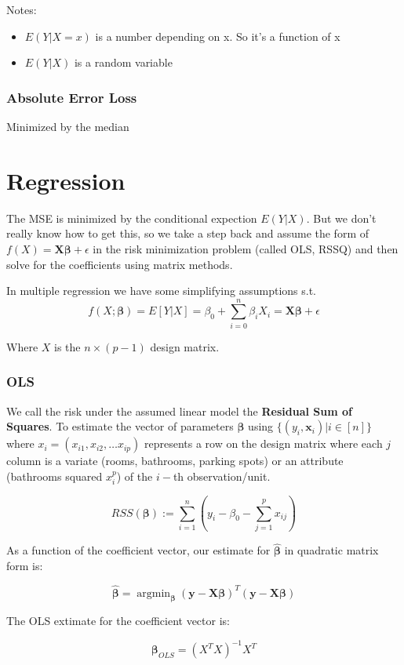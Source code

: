 \documentclass{article}
\DeclareMathOperator*{\argmin}{argmin} %
\begin{document}
Notes:
\begin{itemize}
\item $E(Y|X=x)$ is a number depending on x. So it's a function of x
\item $E(Y|X)$ is a random variable
\end{itemize}

\subsubsection{Absolute Error Loss}
Minimized by the median



\section{Regression}
The MSE is minimized by the conditional expection $E(Y|X)$. But we don't really know how to get this, so we take a step back and assume the form of $f(X)= \bm X \bm \beta + \epsilon$ in the risk minimization problem (called OLS, RSSQ) and then solve for the coefficients using matrix methods. 

In multiple regression we have some simplifying assumptions s.t. 
\[ f(X;\bm \beta) = E[Y|X] = \beta_0 + \sum_{i=0}^{n} \beta_i X_i = \bm X \bm \beta + \epsilon\]

Where $X$ is the $n \times (p-1)$ design matrix. 

\subsubsection{OLS}
We call the risk under the assumed linear model the \textbf{Residual Sum of Squares}. To estimate the vector of parameters $\bm \beta$ using $\{ (y_i, \bm x_i) \vert i \in [n] \}$ where $x_i = (x_{i1}, x_{i2}, \dots x_{ip})$ represents a row on the design matrix where each $j$ column is a variate (rooms, bathrooms, parking spots) or an attribute (bathrooms squared $x_i^p$) of the $i-$th observation/unit.

\[ RSS(\bm \beta)  := \sum_{i=1}^n(y_i - \beta_0 - \sum_{j=1}^p x_{ij})\]

As a function of the coefficient vector, our estimate for $\bm \hat \beta$ in quadratic matrix form is:

\[ \bm \hat \beta = \argmin_{\bm \beta} (\bm y - \bm X \bm \beta)^T (\bm y - \bm X \bm \beta) \]

The OLS extimate for the coefficient vector is:

\[ \bm \beta_{OLS} = (X^T X)^{-1}X^T\]
\end{document}
